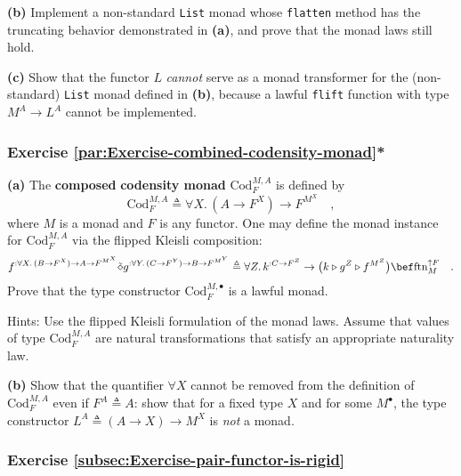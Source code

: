\textbf{(b)} Implement a non-standard \lstinline!List! monad whose
\lstinline!flatten! method has the truncating behavior demonstrated
in \textbf{(a)}, and prove that the monad laws still hold.

\textbf{(c)} Show that the functor $L$ \emph{cannot} serve as a monad
transformer for the (non-standard) \lstinline!List! monad defined
in \textbf{(b)}, because a lawful \lstinline!flift! function with
type $M^{A}\rightarrow L^{A}$ cannot be implemented.


\subsubsection{Exercise \label{par:Exercise-combined-codensity-monad}\ref{par:Exercise-combined-codensity-monad}{*}}

\textbf{(a)} The \textbf{composed} \textbf{codensity
monad} $\text{Cod}_{F}^{M,A}$ is defined by
\[
\text{Cod}_{F}^{M,A}\triangleq\forall X.\,(A\rightarrow F^{X})\rightarrow F^{M^{X}}\quad,
\]
where $M$ is a monad and $F$ is any functor. One may define the
monad instance for $\text{Cod}_{F}^{M,A}$ via the flipped Kleisli
composition:
\[
f^{:\forall X.\,(B\rightarrow F^{X})\rightarrow A\rightarrow F^{M^{X}}}\tilde{\diamond}g^{:\forall Y.\,(C\rightarrow F^{Y})\rightarrow B\rightarrow F^{M^{Y}}}\triangleq\forall Z.\,k^{:C\rightarrow F^{Z}}\rightarrow\big(k\triangleright g^{Z}\triangleright f^{M^{Z}}\big)\bef\text{ftn}_{M}^{\uparrow F}\quad.
\]
Prove that the type constructor $\text{Cod}_{F}^{M,\bullet}$ is a
lawful monad.

Hints: Use the flipped Kleisli formulation of the monad laws. Assume
that values of type $\text{Cod}_{F}^{M,A}$ are natural transformations
that satisfy an appropriate naturality law.

\textbf{(b)} Show that the quantifier $\forall X$ cannot be removed
from the definition of $\text{Cod}_{F}^{M,A}$ even if $F^{A}\triangleq A$:
show that for a fixed type $X$ and for some $M^{\bullet}$, the type
constructor $L^{A}\triangleq(A\rightarrow X)\rightarrow M^{X}$ is
\emph{not} a monad.

\subsubsection{Exercise \label{subsec:Exercise-pair-functor-is-rigid}\ref{subsec:Exercise-pair-functor-is-rigid}}

